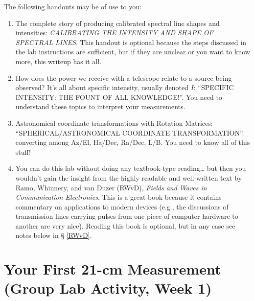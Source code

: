 \documentclass[11pt,preprint]{aastex}
\begin{document}
\noindent
The following handouts may be of use to you:
\begin{enumerate}

\item The complete story of producing calibrated spectral line shapes
  and intensities: {\it CALIBRATING THE INTENSITY AND SHAPE OF SPECTRAL
  LINES}. This handout is optional because the steps discussed in
  the lab instructions are sufficient, but
  if they are unclear or you want to know more, this writeup has it all.

\item How does the power we receive with a telescope relate to a source being
  observed? It's all about specific intensity, usually denoted $I$:
  ``SPECIFIC INTENSITY: THE FOUNT OF ALL KNOWLEDGE!''. 
  You need to understand these topics to interpret your measurements.

\item Astronomical coordinate transformations with Rotation Matrices:
  ``SPHERICAL/ASTRONOMICAL COORDINATE
  TRANSFORMATION''. converting among Az/El, Ha/Dec, Ra/Dec, L/B. 
    You need to know all of this stuff!

\item You can do this lab without doing any textbook-type reading\dots
  but then you wouldn't gain the insight from the highly readable and
  well-written text by Ramo, Whinnery, and van Duzer (RWvD), {\it Fields
    and Waves in Communication Electronics}. This is a great book
  because it contains commentary on applications to modern devices
  (e.g., the discussions of transmission lines carrying pulses from one
  piece of computer hardware to another are very nice).  Reading this
  book is optional, but in any case see notes below in \S
  \ref{RWvD}.

\end{enumerate}

\section{Your First 21-cm Measurement (Group Lab Activity, Week 1)}
\label{radioastro}
\end{document}
